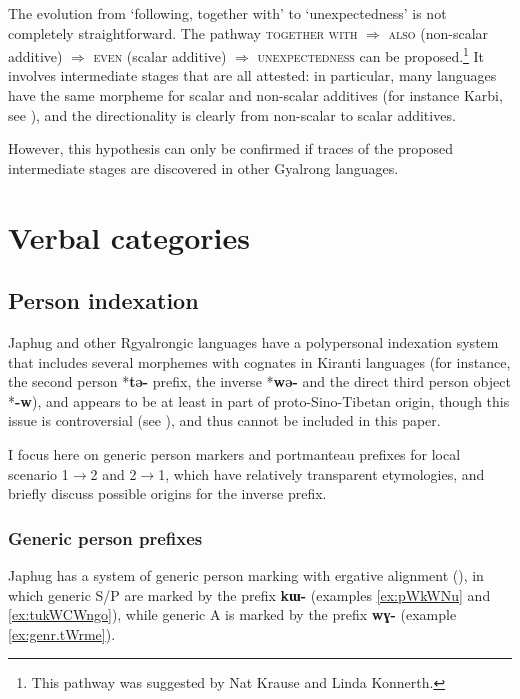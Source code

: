 \documentclass[oldfontcommands,oneside,a4paper,11pt]{article}
\newcommand{\ipa}[1]{\mbox{\phon\textbf{#1}}} %
\begin{document}
The evolution from `following, together with' to `unexpectedness' is not completely straightforward. The pathway \textsc{together with} $\Rightarrow$ \textsc{also} (non-scalar additive) $\Rightarrow$ \textsc{even} (scalar additive) $\Rightarrow$ \textsc{unexpectedness} can be proposed.\footnote{This pathway was suggested by Nat Krause and Linda Konnerth.} It involves intermediate stages that are all attested: in particular, many languages have the same morpheme for scalar and non-scalar additives (for instance Karbi, see \citealt{konnerth14additive}), and the directionality is clearly from non-scalar to scalar additives.

However, this hypothesis can only be confirmed if traces of the proposed intermediate stages are discovered in other Gyalrong languages.

  \section{Verbal categories} 

\subsection{Person indexation} 
Japhug and other Rgyalrongic languages have a polypersonal indexation system that includes several morphemes with cognates in Kiranti languages (for instance, the second person *\ipa{tə-} prefix, the inverse *\ipa{wə-} and the direct third person object *\ipa{-w}), and appears to be at least in part of proto-Sino-Tibetan origin, though this issue is controversial (see \citealt{delancey11prefixes, jacques12agreement}), and thus cannot be included in this paper.


I focus here on generic person markers and portmanteau prefixes for local scenario 1$\rightarrow$2 and 2$\rightarrow$1, which have relatively transparent etymologies, and briefly discuss possible origins for the inverse prefix.


\subsubsection{Generic person prefixes}

Japhug has a system of generic person marking with ergative alignment (\citealt{jacques12demotion}), in which generic S/P are marked by the prefix \ipa{kɯ-} (examples \ref{ex:pWkWNu} and \ref{ex:tukWCWngo}), while generic A is marked by the prefix \ipa{wɣ-} (example \ref{ex:genr.tWrme}).
\end{document}
